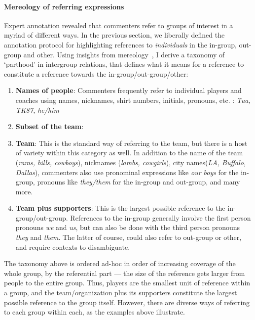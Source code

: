 \paragraph{Mereology of referring expressions} Expert annotation revealed that commenters refer to groups of interest in a myriad of different ways. In the previous section, we liberally defined the annotation protocol for highlighting references to \emph{individuals} in the in-group, out-group and other. Using insights from mereology~\citep{sep-mereology}, I derive a taxonomy of `parthood' in intergroup relations, that defines what it means for a reference to constitute a reference towards the in-group/out-group/other:

\begin{enumerate}
    \item \textbf{Names of people}: Commenters frequently refer to individual players and coaches using names, nicknames, shirt numbers, initials, pronouns, etc. : \emph{Tua, TK87, he/him\textellipsis}
    \item \textbf{Subset of the team}: 
    \item \textbf{Team}: This is the standard way of referring to the team, but there is a host of variety within this category as well. In addition to the name of the team (\emph{rams, bills, cowboys}), nicknames (\emph{lambs, cowgirls}), city names(\emph{LA, Buffalo, Dallas}), commenters also use pronominal expressions like \emph{our boys} for the in-group, pronouns like \emph{they/them} for the in-group and out-group, and many more.
    \item \textbf{Team plus supporters}: This is the largest possible reference to the in-group/out-group. References to the in-group generally involve the first person pronouns \emph{we} and \emph{us}, but can also be done with the third person pronouns \emph{they} and \emph{them}. The latter of course, could also refer to out-group or other, and require contexts to disambiguate.
\end{enumerate}

The taxonomy above is ordered ad-hoc in order of increasing coverage of the whole group, by the referential part --- the size of the reference gets larger from people to the entire group. Thus, players are the smallest unit of reference within a group, and the team/organization plus its supporters constitute the largest possible reference to the group itself. However, there are diverse ways of referring to each group within each, as the examples above illustrate.

